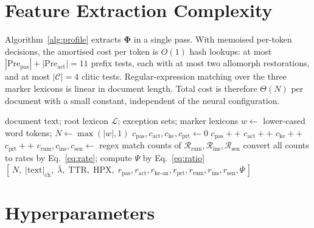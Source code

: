 \section{Feature Extraction Complexity}
\label{app:complexity}

Algorithm~\ref{alg:profile} extracts $\bm{\Phi}$ in a single pass. With memoised per-token decisions, the
amortised cost per token is $O(1)$ hash lookups: at most $|\mathrm{Pre}_{\text{pas}}|+|\mathrm{Pre}_{\text{act}}|=11$
prefix tests, each with at most two allomorph restorations, and at most $|\mathcal{C}|=4$ clitic tests.
Regular-expression matching over the three marker lexicons is linear in document length. Total cost is
therefore $\Theta(N)$ per document with a small constant, independent of the neural configuration.

\begin{algorithm}[h]
\caption{Morpho-evidential profile $\bm{\Phi}$}
\label{alg:profile}
\begin{algorithmic}[1]
\Require document text; root lexicon $\mathcal{L}$; exception sets; marker lexicons
\State $w\gets$ lower-cased word tokens; $N\gets\max(|w|,1)$
\State $c_{\text{pas}},c_{\text{act}},c_{\text{ke}},c_{\text{prt}}\gets0$
   $c_{\text{pas}}{+}{+}$
   $c_{\text{act}}{+}{+}$
   $c_{\text{ke}}{+}{+}$
  \EndIf
   $c_{\text{prt}}{+}{+}$ \EndIf
\EndFor
\State $c_{\text{rum}},c_{\text{ins}},c_{\text{sen}}\gets$ regex match counts of $\mathcal{R}_{\text{rum}},\mathcal{R}_{\text{ins}},\mathcal{R}_{\text{sen}}$
\State convert all counts to rates by Eq.~\eqref{eq:rate}; compute $\Psi$ by Eq.~\eqref{eq:ratio}
\State \Return $[\,N,\;|\text{text}|_{\text{ch}},\;\bar\lambda,\;\mathrm{TTR},\;\mathrm{HPX},\;r_{\text{pas}},r_{\text{act}},r_{\text{ke-an}},r_{\text{prt}},r_{\text{rum}},r_{\text{ins}},r_{\text{sen}},\Psi\,]$
\end{algorithmic}
\end{algorithm}

\section{Hyperparameters}
\label{app:hyper}

